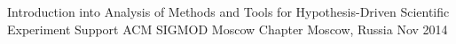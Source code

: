 \begin{cventries}
  \cventry
    {Introduction into Analysis of Methods and Tools for Hypothesis-Driven Scientific Experiment Support }
    {ACM SIGMOD Moscow Chapter}
    {Moscow, Russia}
    {Nov 2014}
    {
     \begin{cvitems}
        \item {}
      \end{cvitems}
    }
\end{cventries}
